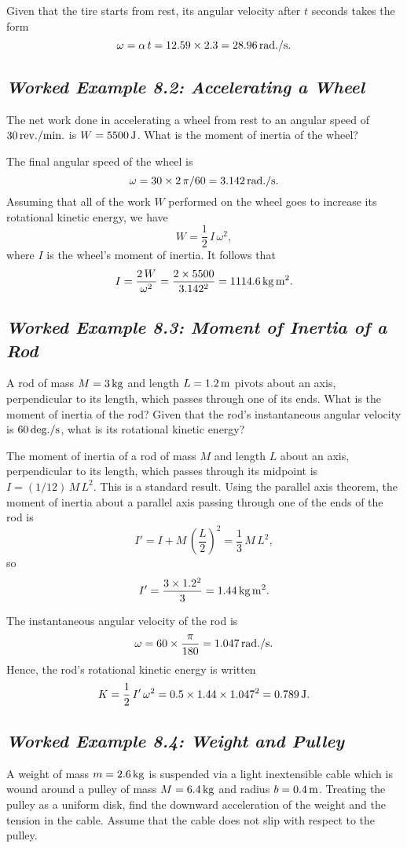 Given that the tire starts from rest, its angular velocity after $t$ seconds takes the form
$$
\omega = \alpha\,t = 12.59\times 2.3 =28.96\,{\rm rad./s}.
$$

\subsection*{\em Worked Example 8.2: Accelerating a Wheel}
 The net work done in accelerating a wheel from rest to
an angular speed of $30\, {\rm rev./min.}$ is $W=5500\,{\rm J}$. What is the moment
of inertia of the wheel?

 The final angular speed of the wheel
is
$$
\omega = 30\times 2\,\pi/60 = 3.142\,{\rm rad./s}.
$$
Assuming that all of the work $W$ performed on the wheel goes to increase its
rotational kinetic energy, we have
$$
W = \frac{1}{2}\,I\,\omega^2,
$$
where $I$ is the wheel's moment of inertia. It follows that
$$
I = \frac{2\,W}{\omega^2} = \frac{2\times 5500}{3.142^2}= 1114.6\,{\rm kg\,m^2}.
$$

\subsection*{\em Worked Example 8.3: Moment of Inertia of a Rod}
 A rod of mass $M=3\,{\rm kg}$ and length $L=1.2\,{\rm m}$ pivots
about an axis, perpendicular to its length, which passes through one of its ends. What
is the moment of inertia of the rod? Given that the rod's instantaneous angular velocity is
$60\,{\rm deg./s}$, what is its rotational kinetic energy?

 The moment of inertia of a rod of mass $M$ and length $L$ about
an axis,   perpendicular to its length, which passes through its midpoint is
$I=(1/12)\,M\,L^2$. This is a standard result.
Using the parallel axis theorem, the moment of inertia
about a parallel axis passing through one of the ends of the rod
is
$$
I' = I + M\,\left(\frac{L}{2}\right)^2 = \frac{1}{3}\,M\,L^2,
$$
so
$$
I' = \frac{3\times 1.2^2}{3} = 1.44\,{\rm kg\,m^2}.
$$

The instantaneous angular velocity of the rod is
$$
\omega = 60 \times \frac{\pi}{180} = 1.047\,{\rm rad./s}.
$$
Hence, the rod's rotational kinetic energy is written
$$
K = \frac{1}{2}\,I'\,\omega^2 = 0.5\times 1.44\times 1.047^2 = 0.789\,{\rm J}.
$$

\subsection*{\em Worked Example 8.4: Weight and Pulley}
 A weight of mass $m=2.6\,{\rm kg}$ is suspended via
a light inextensible cable which is wound around a pulley of mass $M=6.4\,{\rm kg}$
and radius $b=0.4\,{\rm m}$. Treating the pulley as a uniform disk, find the downward
acceleration of the weight and the tension in the cable. Assume that the cable
does not slip with respect to the pulley.

